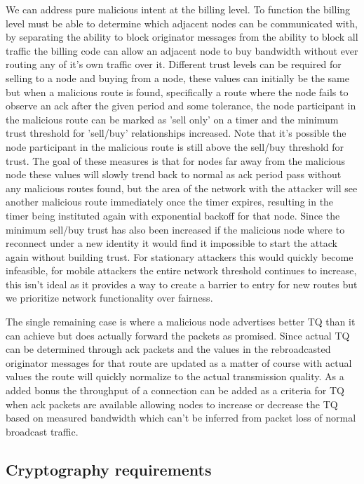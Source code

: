 \documentclass[11pt]{article}
\begin{document}
               We can address pure malicious intent at the billing level. To function the billing level must be able to determine which adjacent nodes can be communicated with, by separating the ability to block originator messages from the ability to block all traffic the billing code can allow an adjacent node to buy bandwidth without ever routing any of it's own traffic over it. Different trust levels can be required for selling to a node and buying from a node, these values can initially be the same but when a malicious route is found, specifically a route where the node fails to observe an ack after the given period and some tolerance, the node participant in the malicious route can be marked as 'sell only' on a timer and the minimum trust threshold for 'sell/buy' relationships increased. Note that it's possible the node participant in the malicious route is still above the sell/buy threshold for trust. The goal of these measures is that for nodes far away from the malicious node these values will slowly trend back to normal as ack period pass without any malicious routes found, but the area of the network with the attacker will see another malicious route immediately once the timer expires, resulting in the timer being instituted again with exponential backoff for that node. Since the minimum sell/buy trust has also been increased if the malicious node where to reconnect under a new identity it would find it impossible to start the attack again without building trust. For stationary attackers this would quickly become infeasible, for mobile attackers the entire network threshold continues to increase, this isn't ideal as it provides a way to create a barrier to entry for new routes but we prioritize network functionality over fairness.
               
               The single remaining case is where a malicious node advertises better TQ than it can achieve but does actually forward the packets as promised. Since actual TQ can be determined through ack packets and the values in the rebroadcasted originator messages for that route are updated as a matter of course with actual values the route will quickly normalize to the actual transmission quality. As a added bonus the throughput of a connection can be added as a criteria for TQ when ack packets are available allowing nodes to increase or decrease the TQ based on measured bandwidth which can't be inferred from packet loss of normal broadcast traffic.
               
               
    \subsection{Cryptography requirements}
    
\end{document}
